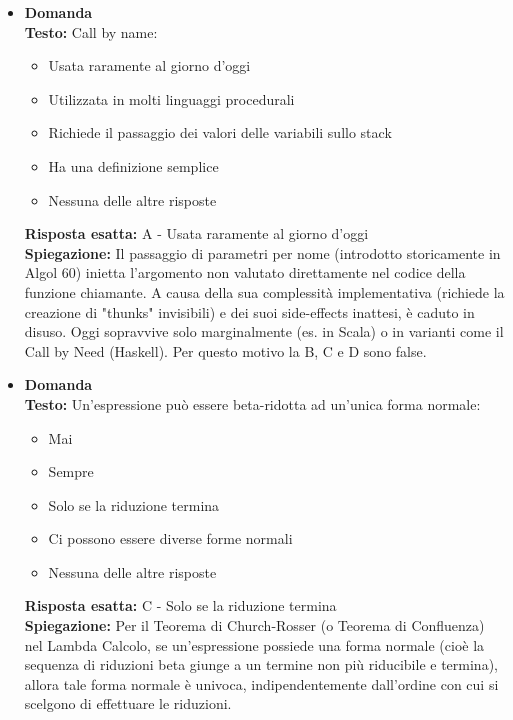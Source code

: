 \documentclass[12pt, a4paper]{article}
\newcounter{domandateoria}
\begin{document}
\begin{itemize}
    \item {}\textbf{Domanda \thedomandateoria} \\
    \textbf{Testo:} Call by name:
    \begin{itemize}
        \item[A)] Usata raramente al giorno d'oggi
        \item[B)] Utilizzata in molti linguaggi procedurali
        \item[C)] Richiede il passaggio dei valori delle variabili sullo stack
        \item[D)] Ha una definizione semplice
        \item[E)] Nessuna delle altre risposte
    \end{itemize}
    \textbf{Risposta esatta:} A - Usata raramente al giorno d'oggi \\
    \textbf{Spiegazione:} Il passaggio di parametri per nome (introdotto storicamente in Algol 60) inietta l'argomento non valutato direttamente nel codice della funzione chiamante. A causa della sua complessità implementativa (richiede la creazione di "thunks" invisibili) e dei suoi side-effects inattesi, è caduto in disuso. Oggi sopravvive solo marginalmente (es. in Scala) o in varianti come il Call by Need (Haskell). Per questo motivo la B, C e D sono false.
    \vspace{0.3cm}

\newpage

    \item {}\textbf{Domanda \thedomandateoria} \\
    \textbf{Testo:} Un'espressione può essere beta-ridotta ad un'unica forma normale:
    \begin{itemize}
        \item[A)] Mai
        \item[B)] Sempre
        \item[C)] Solo se la riduzione termina
        \item[D)] Ci possono essere diverse forme normali
        \item[E)] Nessuna delle altre risposte
    \end{itemize}
    \textbf{Risposta esatta:} C - Solo se la riduzione termina \\
    \textbf{Spiegazione:} Per il Teorema di Church-Rosser (o Teorema di Confluenza) nel Lambda Calcolo, se un'espressione possiede una forma normale (cioè la sequenza di riduzioni beta giunge a un termine non più riducibile e termina), allora tale forma normale è univoca, indipendentemente dall'ordine con cui si scelgono di effettuare le riduzioni.
    \vspace{0.3cm}


\end{itemize}
\end{document}
